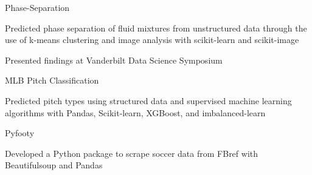 
\begin{cventries}
  \cventry
    {} %
    {Phase-Separation} %
    {} %
    {} %
    {
      \begin{cvitems} %
        \item {Predicted phase separation of fluid mixtures from unstructured
            data through the use of
            k-means clustering and image analysis with scikit-learn and
              scikit-image}
        \item{Presented findings at Vanderbilt Data Science Symposium}
      \end{cvitems}
    }

  \cventry
    {} %
    {MLB Pitch Classification} %
    {} %
    {} %
    {
      \begin{cvitems} %
      	\item {Predicted pitch types using
            structured data and supervised machine learning algorithms with
              Pandas,\newline
              Scikit-learn, XGBoost, and
              imbalanced-learn}
      \end{cvitems}
    }

  \cventry
    {} %
    {Pyfooty} %
    {} %
    {} %
    {
      \begin{cvitems} %
      	\item {Developed a Python package to scrape soccer data
            from FBref with Beautifulsoup and Pandas}
      \end{cvitems}
    }
\end{cventries}
